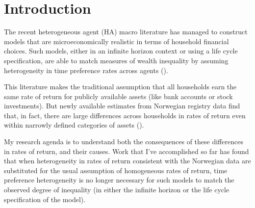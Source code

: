 \documentclass[\econtexRoot/Chp1proposal]{subfiles}
\begin{document}
\hypertarget{Introduction}{}
\section{Introduction}\notinsubfile{\label{sec:intro}}
\setcounter{page}{0}

\par The recent heterogeneous agent (HA) macro literature has managed to construct models that are microeconomically realistic in terms of household financial choices. Such models, either in an infinite horizon context or using a life cycle specification, are able to match measures of wealth inequality by assuming heterogeneity in time preference rates across agents (\cite{cstw2017}).

\par This literature makes the traditional assumption that all households earn the same rate of return for publicly available assets (like bank accounts or stock investments). But newly available estimates from Norwegian registry data find that, in fact, there are large differences across households in rates of return even within narrowly defined categories of assets (\cite{aflgdmlp20}). %

\par My research agenda is to understand both the consequences of these differences in rates of return, and their causes. Work that I've accomplished so far has found that when heterogeneity in rates of return consistent with the Norwegian data are substituted for the usual assumption of homogeneous rates of return, time preference heterogeneity is no longer necessary for such models to match the observed degree of inequality (in either the infinite horizon or the life cycle specification of the model).


\onlyinsubfile{}

\end{document}

